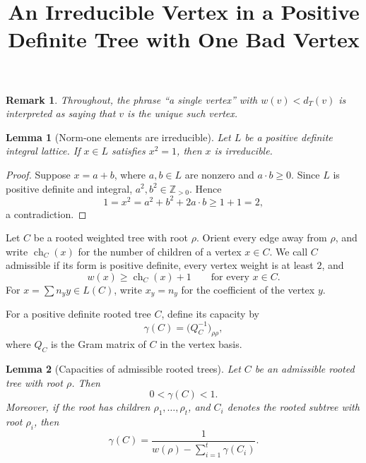 \documentclass[11pt]{article}
\newtheorem{lemma}{Lemma}
\newtheorem{remark}{Remark}
\DeclareMathOperator{\ch}{ch}
\begin{document}
\title{An Irreducible Vertex in a Positive Definite Tree with One Bad Vertex}
\author{}
\date{}
\maketitle

\begin{remark}
Throughout, the phrase ``a single vertex'' with \(w(v)<d_T(v)\) is interpreted as saying that \(v\) is the unique such vertex.
\end{remark}

\begin{lemma}[Norm-one elements are irreducible]
Let \(L\) be a positive definite integral lattice. If \(x\in L\) satisfies \(x^2=1\), then \(x\) is irreducible.
\end{lemma}

\begin{proof}
Suppose \(x=a+b\), where \(a,b\in L\) are nonzero and \(a\cdot b\ge 0\). Since \(L\) is positive definite and integral, \(a^2,b^2\in \mathbb Z_{>0}\). Hence
\[
1=x^2=a^2+b^2+2a\cdot b\ge 1+1=2,
\]
a contradiction.
\end{proof}

Let \(C\) be a rooted weighted tree with root \(\rho\). Orient every edge away from \(\rho\), and write \(\ch_C(x)\) for the number of children of a vertex \(x\in C\). We call \(C\) admissible if its form is positive definite, every vertex weight is at least \(2\), and
\[
w(x)\ge \ch_C(x)+1
\qquad \text{for every } x\in C.
\]
For \(x=\sum n_y y\in L(C)\), write \(x_y=n_y\) for the coefficient of the vertex \(y\).

For a positive definite rooted tree \(C\), define its capacity by
\[
\gamma(C)=\bigl(Q_C^{-1}\bigr)_{\rho\rho},
\]
where \(Q_C\) is the Gram matrix of \(C\) in the vertex basis.

\begin{lemma}[Capacities of admissible rooted trees]
Let \(C\) be an admissible rooted tree with root \(\rho\). Then
\[
0<\gamma(C)<1.
\]
Moreover, if the root has children \(\rho_1,\dots,\rho_t\), and \(C_i\) denotes the rooted subtree with root \(\rho_i\), then
\[
\gamma(C)=\frac{1}{w(\rho)-\sum_{i=1}^t \gamma(C_i)}.
\]
\end{lemma}
\end{document}
